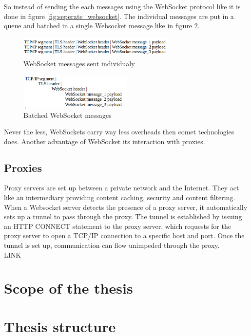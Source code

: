 So instead of sending the each messages using the WebSocket protocol like it is
done in figure \ref{fig:seperate_websocket}. The individual messages are put in
a queue and batched in a single Websocket message like in figure
\ref{fig:batched_websocket}.


\begin{figure}[H]
\centering
\includegraphics[width=0.7\textwidth]{./Figures/separate_websocket.png}
\caption[separateWebsocket]{WebSocket messages sent individualy \citep{Reference30}}
\label{fig:separate_websocket}
\end{figure}

\begin{figure}[htbp]
\centering
\includegraphics[width=0.5\textwidth]{./Figures/batched_websocket.png}
\caption[batchedWebsocket]{Batched WebSocket messages \citep{Reference30}}
\label{fig:batched_websocket}
\end{figure}

Never the less, WebSockets carry way less overheads then comet technologies
does. Another advantage of WebSocket its interaction with proxies.\\

\subsection{Proxies}

Proxy servers are set up between a private network and the Internet. They act
like an intermediary providing content caching, security and content
filtering.\\

When a Websocket server detects the presence of a proxy server, it
automatically sets up a tunnel to pass through the proxy. The tunnel is
established by issuing an HTTP CONNECT statement to the proxy server, which
requests for the proxy server to open a TCP/IP connection to a specific host
and port. Once the tunnel is set up, communication can flow unimpeded through
the proxy.\\

LINK

\section{Scope of the thesis}
\section{Thesis structure}
